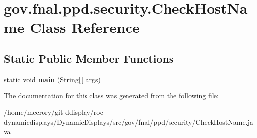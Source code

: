 \hypertarget{classgov_1_1fnal_1_1ppd_1_1security_1_1CheckHostName}{\section{gov.\-fnal.\-ppd.\-security.\-Check\-Host\-Name Class Reference}
\label{classgov_1_1fnal_1_1ppd_1_1security_1_1CheckHostName}
}
\subsection*{Static Public Member Functions}
\begin{DoxyCompactItemize}
\item 
\hypertarget{classgov_1_1fnal_1_1ppd_1_1security_1_1CheckHostName_aaa7b16bd1e9939eb39940f2c5ea0883a}{static void {\bfseries main} (String\mbox{[}$\,$\mbox{]} args)}\label{classgov_1_1fnal_1_1ppd_1_1security_1_1CheckHostName_aaa7b16bd1e9939eb39940f2c5ea0883a}

\end{DoxyCompactItemize}


The documentation for this class was generated from the following file\-:\begin{DoxyCompactItemize}
\item 
/home/mccrory/git-\/ddisplay/roc-\/dynamicdisplays/\-Dynamic\-Displays/src/gov/fnal/ppd/security/Check\-Host\-Name.\-java\end{DoxyCompactItemize}
